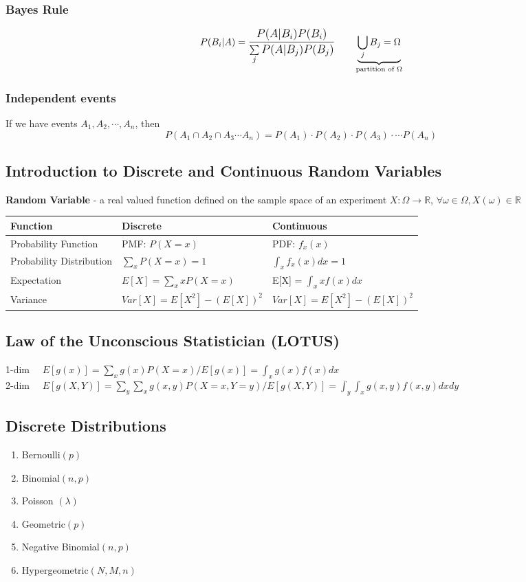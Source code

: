 \subsubsection*{Bayes Rule}
\begin{equation*}
	P(B_i|A) = \mathlarger{\frac{P(A|B_i)P(B_i)}{\sum\limits_j P(A|B_j)P(B_j)}} \quad \quad \underbrace{\bigcup\limits_j B_j = \Omega}_{\text{partition of $\Omega$}}
\end{equation*}
\subsubsection*{Independent events}
If we have events $A_1, A_2, \cdots, A_n$, then
\begin{equation*}
	P(A_1 \cap A_2 \cap A_3 \cdots A_n) = P(A_1) \cdot P(A_2)\cdot P(A_3) \cdot \cdots P(A_n)
\end{equation*}
\subsection*{Introduction to Discrete and Continuous Random Variables}
\textbf{Random Variable} - a real valued function defined on the sample space of an experiment $X:\Omega \rightarrow \mathbb{R}$, $\forall \omega \in \Omega, X(\omega) \in \mathbb{R}$\\
\begin{tabularx}{\textwidth}{l|X|X}
 \textbf{Function} & \textbf{Discrete} & \textbf{Continuous} \\
\hline
\hline
Probability Function & PMF: $P(X=x)$ & PDF: $f_x(x)$\\
\hline
Probability Distribution & $\sum\limits_x P(X=x) = 1$ & $\int_x f_x(x) dx = 1$\\
\hline
Expectation & $E[X] = \sum\limits_x xP(X=x)$ & E[X] = $\int_x xf(x) dx$\\
\hline
Variance & $Var[X] = E[X^2] - (E[X])^2$ & $Var[X] = E[X^2] - (E[X])^2$
\end{tabularx}
\subsection*{Law of the Unconscious Statistician (LOTUS)}
1-dim $\quad E[g(x)] = \sum\limits_x g(x) P(X=x) \bigg/ E[g(x)] = \int_x g(x)f(x)dx$\\
2-dim $\quad E[g(X,Y)] = \sum\limits_y \sum\limits_x g(x,y) P(X=x,Y=y) \bigg/ E[g(X,Y)] = \int_y \int_x g(x,y) f(x,y)dx dy$
\subsection*{Discrete Distributions}
\begin{multicols}{2}
	\begin{enumerate}
	\item Bernoulli$(p)$
	\item Binomial$(n,p)$
	\item Poisson $(\lambda)$
	\item Geometric$(p)$
	\item Negative Binomial$(n,p)$
	\item Hypergeometric$(N,M,n)$
\end{enumerate}
\end{multicols}
